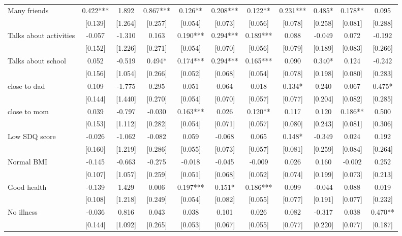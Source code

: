 \documentclass[12pt]{article}
\begin{document}
\begin{table}[ht]
\begin{center}
\begin{adjustbox}{width=1.2\textwidth,center=\textwidth}
\begin{tabular}{l*{10}{c}}
Many friends & 0.422*** & 1.892 & 0.867*** & 0.126** & 0.208*** & 0.122** & 0.231*** & 0.485* & 0.178** & 0.095 \\
 & [0.139] & [1.264] & [0.257] & [0.054] & [0.073] & [0.056] & [0.078] & [0.258] & [0.081] & [0.288] \\
Talks about activities & -0.057 & -1.310 & 0.163 & 0.190*** & 0.294*** & 0.189*** & 0.088 & -0.049 & 0.072 & -0.192 \\
 & [0.152] & [1.226] & [0.271] & [0.054] & [0.070] & [0.056] & [0.079] & [0.189] & [0.083] & [0.266] \\
Talks about school & 0.052 & -0.519 & 0.494* & 0.174*** & 0.294*** & 0.165*** & 0.090 & 0.340* & 0.124 & -0.242 \\
 & [0.156] & [1.054] & [0.266] & [0.052] & [0.068] & [0.054] & [0.078] & [0.198] & [0.080] & [0.283] \\
close to dad & 0.109 & -1.775 & 0.295 & 0.051 & 0.064 & 0.018 & 0.134* & 0.240 & 0.067 & 0.475* \\
 & [0.144] & [1.440] & [0.270] & [0.054] & [0.070] & [0.057] & [0.077] & [0.204] & [0.082] & [0.285] \\
close to mom & 0.039 & -0.797 & -0.030 & 0.163*** & 0.026 & 0.120** & 0.117 & 0.120 & 0.186** & 0.500 \\
 & [0.153] & [1.112] & [0.282] & [0.054] & [0.071] & [0.057] & [0.080] & [0.243] & [0.081] & [0.306] \\
Low SDQ score  & -0.026 & -1.062 & -0.082 & 0.059 & -0.068 & 0.065 & 0.148* & -0.349 & 0.024 & 0.192 \\
 & [0.160] & [1.219] & [0.286] & [0.055] & [0.073] & [0.057] & [0.081] & [0.259] & [0.084] & [0.264] \\
Normal BMI & -0.145 & -0.663 & -0.275 & -0.018 & -0.045 & -0.009 & 0.026 & 0.160 & -0.002 & 0.252 \\
 & [0.107] & [1.057] & [0.259] & [0.051] & [0.068] & [0.052] & [0.074] & [0.199] & [0.073] & [0.213] \\
Good health & -0.139 & 1.429 & 0.006 & 0.197*** & 0.151* & 0.186*** & 0.099 & -0.044 & 0.088 & 0.019 \\
 & [0.108] & [1.218] & [0.249] & [0.054] & [0.082] & [0.055] & [0.077] & [0.191] & [0.077] & [0.232] \\
No illness & -0.036 & 0.816 & 0.043 & 0.038 & 0.101 & 0.026 & 0.082 & -0.317 & 0.038 & 0.470** \\
 & [0.144] & [1.092] & [0.265] & [0.053] & [0.067] & [0.055] & [0.077] & [0.220] & [0.077] & [0.187] \\

\end{tabular}
\end{adjustbox}
\end{center}
\end{table}
\end{document}
